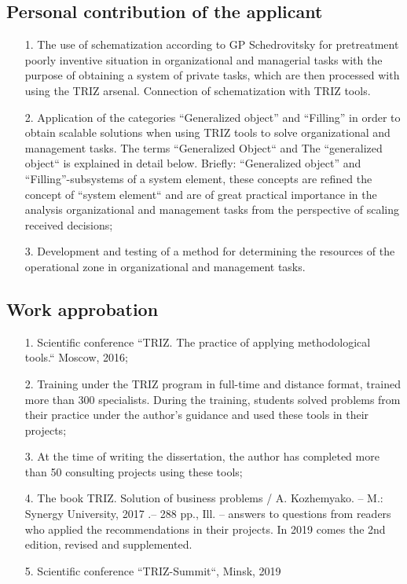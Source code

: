 \subsection{Personal contribution of the applicant}
\begin{itemize}
\item[1.] The use of schematization according to GP Schedrovitsky for
  pretreatment poorly inventive situation in organizational and managerial
  tasks with the purpose of obtaining a system of private tasks, which are
  then processed with using the TRIZ arsenal. Connection of schematization
  with TRIZ tools.
\item[2.] Application of the categories “Generalized object” and “Filling” in
  order to obtain scalable solutions when using TRIZ tools to solve
  organizational and management tasks. The terms “Generalized Object“ and The
  “generalized object“ is explained in detail below. Briefly: “Generalized
  object” and “Filling”-subsystems of a system element, these concepts are
  refined the concept of “system element“ and are of great practical
  importance in the analysis organizational and management tasks from the
  perspective of scaling received decisions;
\item[3.] Development and testing of a method for determining the resources of
  the operational zone in organizational and management tasks.
\end{itemize}
\subsection{Work approbation}
\begin{itemize}
\item[1.] Scientific conference “TRIZ. The practice of applying methodological
  tools.“ Moscow, 2016;
\item[2.] Training under the TRIZ program in full-time and distance format,
  trained more than 300 specialists. During the training, students solved
  problems from their practice under the author’s guidance and used these
  tools in their projects;
\item[3.] At the time of writing the dissertation, the author has completed
  more than 50 consulting projects using these tools;
\item[4.] The book TRIZ. Solution of business problems / A. Kozhemyako. -- M.:
  Synergy University, 2017 .-- 288 pp., Ill. -- answers to questions from
  readers who applied the recommendations in their projects. In 2019 comes the
  2nd edition, revised and supplemented.
\item[5.] Scientific conference “TRIZ-Summit“, Minsk, 2019
\end{itemize}
